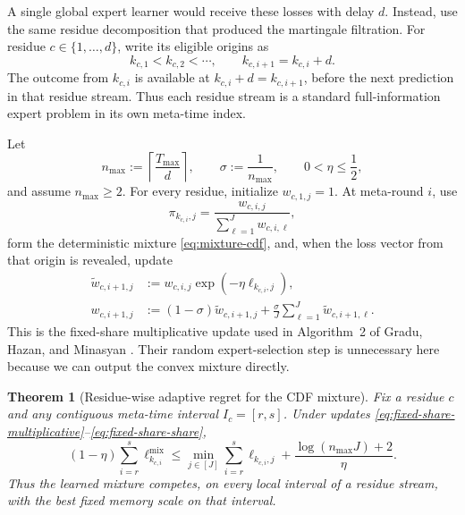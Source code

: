 \documentclass[11pt]{article}
\newtheorem{theorem}{Theorem}
\newcommand{\1}{\mathbf{1}}
\begin{document}
A single global expert learner would receive these losses with delay $d$.
Instead, use the same residue decomposition that produced the martingale
filtration.  For residue $c\in\{1,\ldots,d\}$, write its eligible origins as
\[
    k_{c,1}<k_{c,2}<\cdots,
    \qquad
    k_{c,i+1}=k_{c,i}+d.
\]
The outcome from $k_{c,i}$ is available at $k_{c,i}+d=k_{c,i+1}$, before the
next prediction in that residue stream.  Thus each residue stream is a
standard full-information expert problem in its own meta-time index.

Let
\[
    n_{\max}:=\left\lceil\frac{T_{\max}}{d}\right\rceil,
    \qquad
    \sigma:=\frac1{n_{\max}},
    \qquad
    0<\eta\le\frac12,
\]
and assume $n_{\max}\ge2$.  For every residue, initialize $w_{c,1,j}=1$.
At meta-round $i$, use
\begin{equation}
    \pi_{k_{c,i},j}
    =
    \frac{w_{c,i,j}}{\sum_{\ell=1}^J w_{c,i,\ell}},
    \label{eq:fixed-share-probabilities}
\end{equation}
form the deterministic mixture \eqref{eq:mixture-cdf}, and, when the loss
vector from that origin is revealed, update
\begin{align}
    \widetilde w_{c,i+1,j}
    &:=%
    w_{c,i,j}
    \exp(-\eta\ell_{k_{c,i},j}),
    \label{eq:fixed-share-multiplicative}
    \\
    w_{c,i+1,j}
    &:=%
    (1-\sigma)\widetilde w_{c,i+1,j}
    +
    \frac{\sigma}{J}
    \sum_{\ell=1}^J
    \widetilde w_{c,i+1,\ell}.
    \label{eq:fixed-share-share}
\end{align}
This is the fixed-share multiplicative update used in Algorithm~2 of
Gradu, Hazan, and Minasyan \cite{gradu2023}.  Their random expert-selection
step is unnecessary here because we can output the convex mixture directly.

\begin{theorem}[Residue-wise adaptive regret for the CDF mixture]
\label{thm:residue-adaptive-regret}
Fix a residue $c$ and any contiguous meta-time interval
$I_c=[r,s]$.  Under updates
\eqref{eq:fixed-share-multiplicative}--\eqref{eq:fixed-share-share},
\begin{equation}
\boxed{
    (1-\eta)
    \sum_{i=r}^s
    \ell_{k_{c,i}}^{\mathrm{mix}}
    \le
    \min_{j\in[J]}
    \sum_{i=r}^s
    \ell_{k_{c,i},j}
    +
    \frac{\log(n_{\max}J)+2}{\eta}.
}
\label{eq:residue-adaptive-regret}
\end{equation}
Thus the learned mixture competes, on every local interval of a residue
stream, with the best fixed memory scale on that interval.
\end{theorem}
\end{document}
